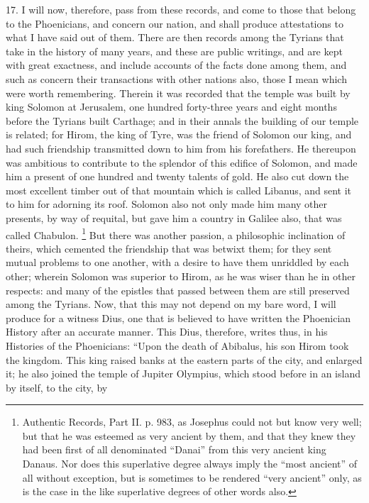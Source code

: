 17. I will now, therefore, pass from these records, and come to those that
belong to the Phoenicians, and concern our nation, and shall produce
attestations to what I have said out of them. There are then records among
the Tyrians that take in the history of many years, and these are public
writings, and are kept with great exactness, and include accounts of the
facts done among them, and such as concern their transactions with other
nations also, those I mean which were worth remembering. Therein it was
recorded that the temple was built by king Solomon at Jerusalem, one
hundred forty-three years and eight months before the Tyrians built
Carthage; and in their annals the building of our temple is related; for
Hirom, the king of Tyre, was the friend of Solomon our king, and had such
friendship transmitted down to him from his forefathers. He thereupon was
ambitious to contribute to the splendor of this edifice of Solomon, and
made him a present of one hundred and twenty talents of gold. He also cut
down the most excellent timber out of that mountain which is called
Libanus, and sent it to him for adorning its roof. Solomon also not only
made him many other presents, by way of requital, but gave him a country
in Galilee also, that was called Chabulon. \footnote{Authentic Records, Part
II. p. 983, as Josephus could not but know very well; but that he was
esteemed as very ancient by them, and that they knew they had been first
of all denominated ``Danai'' from this very ancient king Danaus. Nor does
this superlative degree always imply the ``most ancient'' of all without
exception, but is sometimes to be rendered ``very ancient'' only, as is the
case in the like superlative degrees of other words also.} But there
was another passion, a philosophic inclination of theirs, which cemented
the friendship that was betwixt them; for they sent mutual problems to one
another, with a desire to have them unriddled by each other; wherein
Solomon was superior to Hirom, as he was wiser than he in other respects:
and many of the epistles that passed between them are still preserved
among the Tyrians. Now, that this may not depend on my bare word, I will
produce for a witness Dius, one that is believed to have written the
Phoenician History after an accurate manner. This Dius, therefore, writes
thus, in his Histories of the Phoenicians: ``Upon the death of Abibalus,
his son Hirom took the kingdom. This king raised banks at the eastern
parts of the city, and enlarged it; he also joined the temple of Jupiter
Olympius, which stood before in an island by itself, to the city, by
